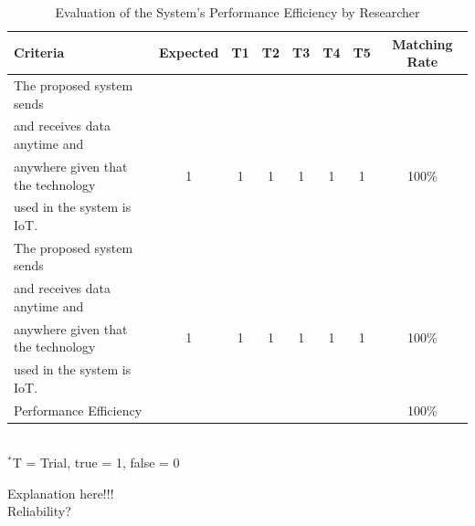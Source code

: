 \begin{table}[h!]
\caption{Evaluation of the System’s Performance Efficiency by Researcher}
\vspace{-1em}
\begin{center}
\fontsize{10}{12}\selectfont
\begin{tabular}{|| l c c c c c c c ||} 
 \hline
 Criteria & Expected & T1 & T2 & T3 & T4 & T5 & Matching Rate \\ [0.5ex] 
 \hline\hline
The proposed system sends &  &  &  &  &  &  &  \\
and receives data anytime and &  &  &  &  &  &  &  \\
anywhere given that the technology & 1 & 1 & 1 & 1 & 1 & 1 & 100\% \\
used in the system is IoT. &  &  &  &  &  &  &  \\ 
\hline
The proposed system sends &  &  &  &  &  &  &  \\
and receives data anytime and &  &  &  &  &  &  &  \\
anywhere given that the technology & 1 & 1 & 1 & 1 & 1 & 1 & 100\% \\
used in the system is IoT. &  &  &  &  &  &  &  \\ 
\hline
Performance Efficiency &  &  &  &  &  &  & 100\% \\ 
\hline
\end{tabular} \\
\footnotesize{\hspace{-10cm}$^*$T = Trial, true = 1, false = 0}
\end{center}
\end{table} 

Explanation here!!! \lipsum[1] \\

\indent\indent Reliability? \\

